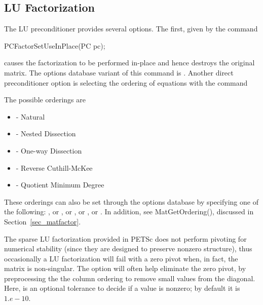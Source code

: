 \subsection{LU Factorization}
\label{sec_factorization}

The LU preconditioner provides several options.  The first, given by
the 
command  
\begin{tabbing}
  PCFactorSetUseInPlace(PC pc);
\end{tabbing}
causes the factorization to be performed in-place and hence
destroys the original matrix.  The options database variant of
this command is . 
Another direct preconditioner option is selecting the ordering
of equations with the command  
\begin{tabbing}
\end{tabbing}
The possible orderings are
\begin{itemize}
\item {} - Natural
\item {} - Nested Dissection
\item {} - One-way Dissection
\item {} - Reverse Cuthill-McKee
\item {} - Quotient Minimum Degree
\end{itemize}
  
  
  
 
These orderings can also be set through the options database by specifying 
one of the following:   , or , or  , or , or .
In addition, see MatGetOrdering(), discussed in Section~\ref{sec_matfactor}.

The sparse LU factorization provided in PETSc does not perform pivoting for 
numerical stability (since they are designed to preserve nonzero 
structure), thus occasionally a LU factorization will fail with a zero 
pivot when, in fact, the matrix is non-singular. The option
 
will often help eliminate the zero pivot, by preprocessing the the 
column ordering to remove small values from the diagonal. Here, 
is an optional tolerance to decide if a value is nonzero; by default it
is~$ 1.e-10.$ 


